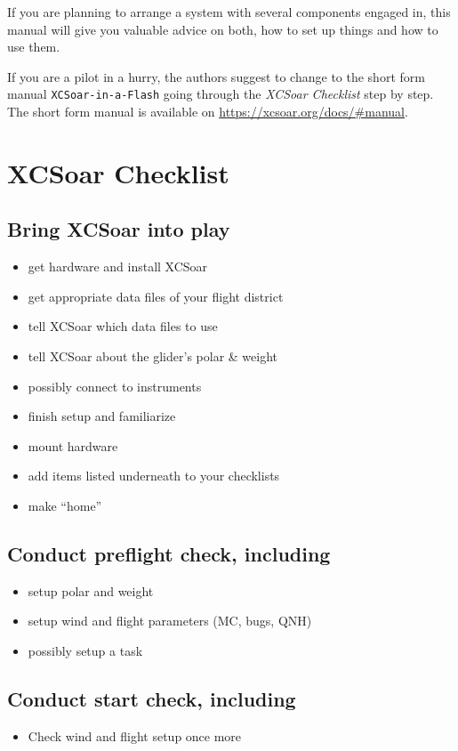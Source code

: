 If you are planning to arrange a system with several components engaged in, 
this manual will give you valuable advice on both, how to set up things and how 
to use them.

If you are a pilot in a hurry, the authors suggest to change to the short form 
manual \texttt{XCSoar-in-a-Flash} going through the \emph{XCSoar Checklist} 
step by step. The short form manual is available on
\url{https://xcsoar.org/docs/#manual}.



\section{XCSoar Checklist}

\subsection*{{Bring XCSoar into play}}
\begin{itemize}
\item get hardware and install XCSoar
\item get appropriate data files of your flight district
\item tell XCSoar which data files to use
\item tell XCSoar about the glider's polar \& weight
\item possibly connect to instruments
\item finish setup and familiarize
\item mount hardware
\item add items listed underneath to your checklists
\item make ``home''
\end{itemize}

\subsection*{Conduct preflight check, including}
\begin{itemize}
\item setup polar and weight
\item setup wind and flight parameters (MC, bugs, QNH)
\item possibly setup a task
\end{itemize}

\subsection*{Conduct start check, including}
\begin{itemize}
\item Check wind and flight setup once more
\end{itemize}
\vspace{2em}

